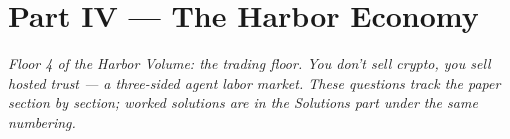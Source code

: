 
\providecommand{\wbtier}[1]{{\scshape\bfseries\textcolor{hhcobalt}{#1}}\enspace}
\providecommand{\wbcheck}{\wbtier{Check.}}
\providecommand{\wbtrace}{\wbtier{Trace.}}
\providecommand{\wbopen}{\wbtier{Open.}}
\providecommand{\wbstar}{{\textcolor{hhcobalt}{$\bigstar$}}\,}

\section*{Part IV --- The Harbor Economy}

\emph{Floor 4 of the Harbor Volume: the trading floor. You don't sell crypto, you
sell hosted trust --- a three-sided agent labor market. These questions track the
paper section by section; worked solutions are in the Solutions part under the same
numbering.}

